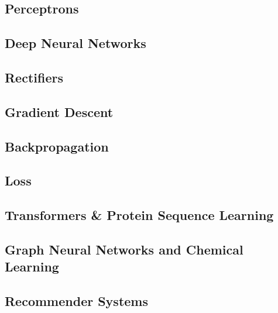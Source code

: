 \hypertarget{perceptrons}{%
\subsection{Perceptrons}\label{perceptrons}}

\hypertarget{deep-neural-networks}{%
\subsection{Deep Neural Networks}\label{deep-neural-networks}}

\hypertarget{rectifiers}{%
\subsection{Rectifiers}\label{rectifiers}}

\hypertarget{gradient-descent}{%
\subsection{Gradient Descent}\label{gradient-descent}}

\hypertarget{backpropagation}{%
\subsection{Backpropagation}\label{backpropagation}}

\hypertarget{loss}{%
\subsection{Loss}\label{loss}}

\hypertarget{transformers-protein-sequence-learning}{%
\subsection{Transformers \& Protein Sequence
Learning}\label{transformers-protein-sequence-learning}}

\hypertarget{graph-neural-networks-and-chemical-learning}{%
\subsection{Graph Neural Networks and Chemical
Learning}\label{graph-neural-networks-and-chemical-learning}}

\hypertarget{recommender-systems}{%
\subsection{Recommender Systems}\label{recommender-systems}}

